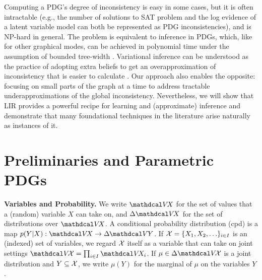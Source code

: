\documentclass[twoside]{article}
\let\cite\citep
\theoremstyle{plain}
\theoremstyle{definition}
\newtheorem{definition}{Definition}
\theoremstyle{remark}
\begin{document}
Computing a PDG's degree of inconsistency is easy in some cases, 
   but it is often intractable (e.g., the number of solutions to SAT problem and the log evidence
   of a latent variable model can both be represented as PDG inconsistencies),
   and is NP-hard in general. 
The problem is equivalent to inference in PDGs, 
   which, like for other graphical modes, 
   can be achieved in polynomial time under the assumption of bounded tree-width \cite{pdg-infer}.   
Variational inference \citep{blei2017variational,kingma2013autoencoding,jordan1999introduction} can be understood as
   the practice of adopting extra beliefs to
   get an over\-approximation of inconsistency that is easier to calculate \cite{one-true-loss}.
Our approach also enables the opposite:
   focusing on small parts of the graph at a time to
   address tractable under\-approximations of the global inconsistency.
%
Nevertheless, we will show that LIR provides a powerful recipe for learning and (approximate) inference and demonstrate that many foundational techniques in the literature arise naturally as instances of it.




\section{Preliminaries and Parametric PDGs}
\textbf{Variables and Probability.}
We write $\V\! X$ for the set of values that a (random) variable $X$ can take on,
and $\Delta \V \! X $ for the set of distributions over $\V\!X$.
A conditional probability distribution (cpd) is a map
$p(Y|X) : \V \!X \to \Delta\mskip-1mu \V \mskip-1mu Y$.
%
If $\mathcal X = \{X_1, X_2, \ldots\}_{i \in I}$ is an (indexed) set of variables, we regard $\mathcal X$ itself as a variable that can take on joint settings $\V\!\X = \prod_{i\in I} \V \! X_i$.
If $\mu \in \Delta \V\!\X$ is a joint distribution and $Y \subseteq \mathcal X$, we write $\mu(Y)$ for the marginal of $\mu$ on the variables $Y$. 
%
\end{document}
